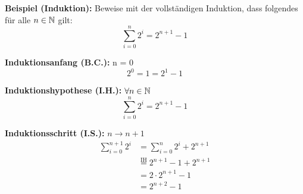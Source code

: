 \textbf{Beispiel (Induktion):} Beweise mit der vollständigen Induktion, dass folgendes für alle $n \in \mathbb{N}$ gilt: \[\sum \limits_{i=0}^n 2^i = 2^{n+1} - 1\]

\textbf{Induktionsanfang (B.C.):} n = 0 \[2^0 = 1 = 2^1 - 1\]

\textbf{Induktionshypothese (I.H.):} $\forall n \in \mathbb{N}$ \[\sum \limits_{i=0}^n 2^i = 2^{n+1} - 1\]

\textbf{Induktionsschritt (I.S.):} $n \rightarrow n + 1$
\begin{align*}
    \sum \limits_{i=0}^{n+1} 2^i &= \sum \limits_{i=0}^{n} 2^i + 2^{n+1} \\
    &\stackrel{\text{IH}}{=} 2^{n+1} - 1 + 2^{n+1} \\
    &= 2 \cdot 2^{n+1} - 1 \\
    &= 2^{n+2} - 1
\end{align*}






